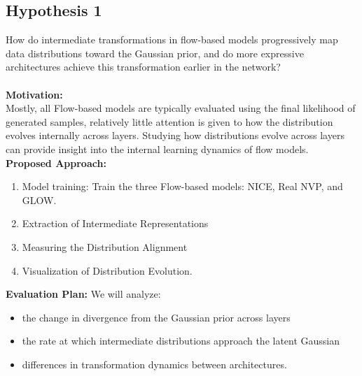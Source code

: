 \documentclass{article}
\begin{document}
\subsection{Hypothesis 1}
How do intermediate transformations in flow-based models progressively map data distributions toward the Gaussian prior, and do more expressive architectures achieve this transformation earlier in the network? \\ \\
\textbf{Motivation:} \\ 
Mostly, all Flow-based models are typically evaluated using the final likelihood of generated samples, relatively little attention is given to how the distribution evolves internally across layers. Studying how distributions evolve across layers can provide insight into the internal learning dynamics of flow models. \\ 
\textbf{Proposed Approach:} 
\begin{enumerate}
    \item Model training: Train the three Flow-based models: NICE, Real NVP, and GLOW. 
    \item Extraction of Intermediate Representations
    \item Measuring the Distribution Alignment
    \item Visualization of Distribution Evolution.
\end{enumerate}
\textbf{Evaluation Plan:} 
We will analyze: 
\begin{itemize}
    \item the change in divergence from the Gaussian prior across layers
    \item the rate at which intermediate distributions approach the latent Gaussian
    \item differences in transformation dynamics between architectures.
\end{itemize}
\end{document}
